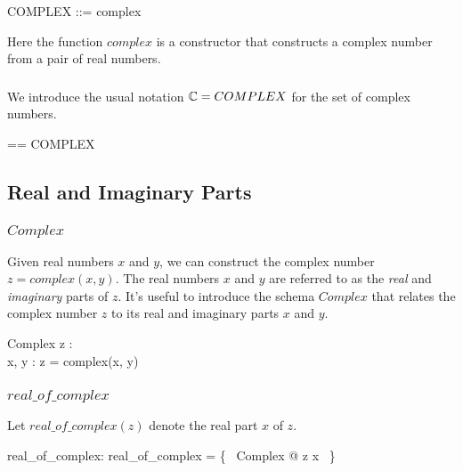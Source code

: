 \documentclass[11pt, oneside]{article}
\begin{document}
\begin{zed}
	COMPLEX ::= complex \ldata \Rtwo \rdata
\end{zed}

Here the function $complex$ is a constructor that constructs a
complex number from a pair of real numbers.

\subsubsection{}

We introduce the usual notation $\mathbb{C} = COMPLEX$ for the set of complex numbers.

\begin{zed}
\C == COMPLEX
\end{zed}

\subsection{Real and Imaginary Parts}

\subsubsection{$Complex$}

Given real numbers $x$ and $y$, we can construct the complex number
$z = complex(x,y)$.
The real numbers $x$ and $y$ are referred to as the \textit{real} and \textit{imaginary} parts of $z$.
It's useful to introduce the schema $Complex$ that relates the complex number $z$ to its
real and imaginary parts $x$ and $y$.

\begin{schema}{Complex}
	z : \C \\
	x, y : \R
\where
	z = complex(x, y)
\end{schema}

\subsubsection{$real\_of\_complex$}

Let $real\_of\_complex(z)$ denote the real part $x$ of $z$.

\begin{axdef}
	real\_of\_complex: \C \fun \R
\where
	real\_of\_complex = \{~ Complex @ z \mapsto x ~\}
\end{axdef}

\subsubsection{}
\end{document}
